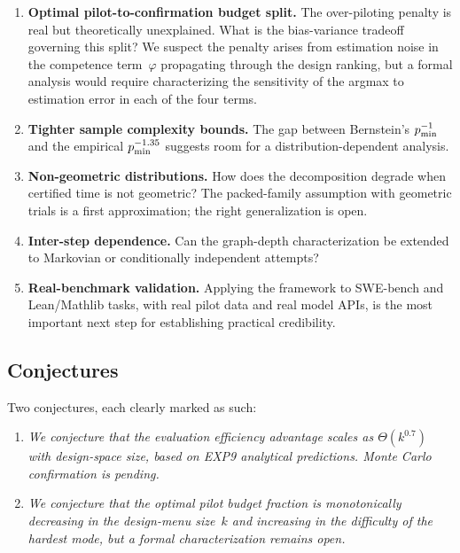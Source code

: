 \begin{enumerate}
\item \textbf{Optimal pilot-to-confirmation budget split.}
The over-piloting penalty is real but theoretically unexplained.
What is the bias-variance tradeoff governing this split?
We suspect the penalty arises from estimation noise in the competence term~$\varphi$ propagating through the design ranking, but a formal analysis would require characterizing the sensitivity of the argmax to estimation error in each of the four terms.

\item \textbf{Tighter sample complexity bounds.}
The gap between Bernstein's $p_{\min}^{-1}$ and the empirical $p_{\min}^{-1.35}$ suggests room for a distribution-dependent analysis.

\item \textbf{Non-geometric distributions.}
How does the decomposition degrade when certified time is not geometric?
The packed-family assumption with geometric trials is a first approximation; the right generalization is open.

\item \textbf{Inter-step dependence.}
Can the graph-depth characterization be extended to Markovian or conditionally independent attempts?

\item \textbf{Real-benchmark validation.}
Applying the framework to SWE-bench and Lean/Mathlib tasks, with real pilot data and real model APIs, is the most important next step for establishing practical credibility.
\end{enumerate}

\subsection{Conjectures}

Two conjectures, each clearly marked as such:

\begin{enumerate}
\item \emph{We conjecture that the evaluation efficiency advantage scales as $\Theta(k^{0.7})$ with design-space size, based on EXP9 analytical predictions.
Monte Carlo confirmation is pending.}

\item \emph{We conjecture that the optimal pilot budget fraction is monotonically decreasing in the design-menu size~$k$ and increasing in the difficulty of the hardest mode, but a formal characterization remains open.}
\end{enumerate}

